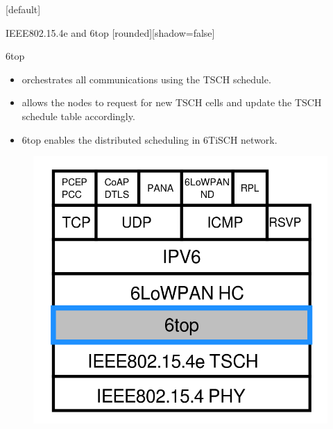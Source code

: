 \documentclass{beamer}
\makeatletter
\newenvironment{withoutheadline}{
        \setbeamertemplate{headline}[default]
        \def\beamer@entrycode{\vspace*{-\headheight}}
    }{}
\makeatother
\begin{document}
\begin{withoutheadline}
\begin{frame}{IEEE802.15.4e and 6top}
[rounded][shadow=false]


\begin{minipage}[t]{0.48\linewidth}

\begin{block}{6top}

    \begin{itemize}
    \item orchestrates all communications using the TSCH schedule.
    \item allows the nodes to request for new TSCH cells and update the TSCH schedule table accordingly.
    \item 6top enables the distributed scheduling in 6TiSCH network.
    \end{itemize}
    \end{block}

\end{minipage}\hfill
\begin{minipage}[t]{0.48\linewidth}
\centering
\begin{figure}[p]

\includegraphics[width=\linewidth]{layers.png}
\end{figure}
\end{minipage}


\end{frame}
\end{withoutheadline}
\end{document}
